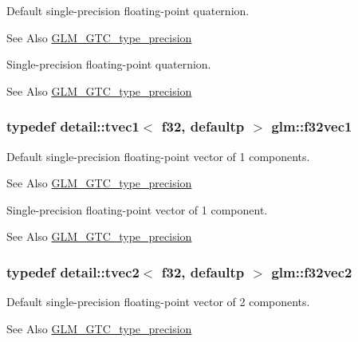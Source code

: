 Default single-\/precision floating-\/point quaternion. \begin{DoxySeeAlso}{See Also}
\hyperlink{group__gtc__type__precision}{G\-L\-M\-\_\-\-G\-T\-C\-\_\-type\-\_\-precision}
\end{DoxySeeAlso}
Single-\/precision floating-\/point quaternion. \begin{DoxySeeAlso}{See Also}
\hyperlink{group__gtc__type__precision}{G\-L\-M\-\_\-\-G\-T\-C\-\_\-type\-\_\-precision} 
\end{DoxySeeAlso}
\hypertarget{group__gtc__type__precision_ga7335bddf7a09ba275d5d04f7681f03e6}{
\subsubsection[{f32vec1}]{\setlength{\rightskip}{0pt plus 5cm}typedef detail\-::tvec1$<$ f32, defaultp $>$ {\bf glm\-::f32vec1}}}\label{group__gtc__type__precision_ga7335bddf7a09ba275d5d04f7681f03e6}
Default single-\/precision floating-\/point vector of 1 components. \begin{DoxySeeAlso}{See Also}
\hyperlink{group__gtc__type__precision}{G\-L\-M\-\_\-\-G\-T\-C\-\_\-type\-\_\-precision}
\end{DoxySeeAlso}
Single-\/precision floating-\/point vector of 1 component. \begin{DoxySeeAlso}{See Also}
\hyperlink{group__gtc__type__precision}{G\-L\-M\-\_\-\-G\-T\-C\-\_\-type\-\_\-precision} 
\end{DoxySeeAlso}
\hypertarget{group__gtc__type__precision_ga0eba48c6b8abbee31dbf5655dd171ead}{
\subsubsection[{f32vec2}]{\setlength{\rightskip}{0pt plus 5cm}typedef detail\-::tvec2$<$ f32, defaultp $>$ {\bf glm\-::f32vec2}}}\label{group__gtc__type__precision_ga0eba48c6b8abbee31dbf5655dd171ead}
Default single-\/precision floating-\/point vector of 2 components. \begin{DoxySeeAlso}{See Also}
\hyperlink{group__gtc__type__precision}{G\-L\-M\-\_\-\-G\-T\-C\-\_\-type\-\_\-precision}
\end{DoxySeeAlso}
